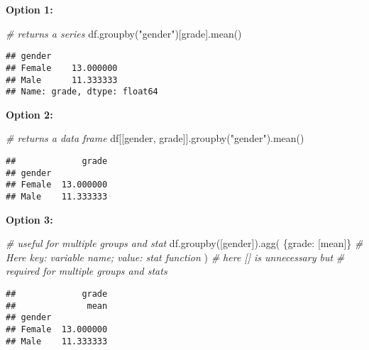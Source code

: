 \documentclass[
]{book}
\newenvironment{Shaded}{\begin{snugshade}}{\end{snugshade}}
\newcommand{\CommentTok}[1]{\textcolor[rgb]{0.56,0.35,0.01}{\textit{#1}}}
\newcommand{\NormalTok}[1]{#1}
\newcommand{\StringTok}[1]{\textcolor[rgb]{0.31,0.60,0.02}{#1}}
\begin{document}
\textbf{Option 1:}

\begin{Shaded}
\begin{Highlighting}[]
\CommentTok{\# returns a series}
\NormalTok{df.groupby(}\StringTok{"gender"}\NormalTok{)[}\StringTok{\textquotesingle{}grade\textquotesingle{}}\NormalTok{].mean()}
\end{Highlighting}
\end{Shaded}

\begin{verbatim}
## gender
## Female    13.000000
## Male      11.333333
## Name: grade, dtype: float64
\end{verbatim}

\textbf{Option 2:}

\begin{Shaded}
\begin{Highlighting}[]
\CommentTok{\# returns a data frame}
\NormalTok{df[[}\StringTok{\textquotesingle{}gender\textquotesingle{}}\NormalTok{, }\StringTok{\textquotesingle{}grade\textquotesingle{}}\NormalTok{]].groupby(}\StringTok{"gender"}\NormalTok{).mean()}
\end{Highlighting}
\end{Shaded}

\begin{verbatim}
##             grade
## gender           
## Female  13.000000
## Male    11.333333
\end{verbatim}

\textbf{Option 3:}

\begin{Shaded}
\begin{Highlighting}[]
\CommentTok{\# useful for multiple groups and stat}
\NormalTok{df.groupby([}\StringTok{\textquotesingle{}gender\textquotesingle{}}\NormalTok{]).agg(}
\NormalTok{    \{}\StringTok{\textquotesingle{}grade\textquotesingle{}}\NormalTok{: [}\StringTok{\textquotesingle{}mean\textquotesingle{}}\NormalTok{]\}}
    \CommentTok{\# Here key: variable name; value: stat function}
\NormalTok{)}
\CommentTok{\# here [] is unnecessary but}
\CommentTok{\# required for multiple groups and stats}
\end{Highlighting}
\end{Shaded}

\begin{verbatim}
##             grade
##              mean
## gender           
## Female  13.000000
## Male    11.333333
\end{verbatim}
\end{document}
